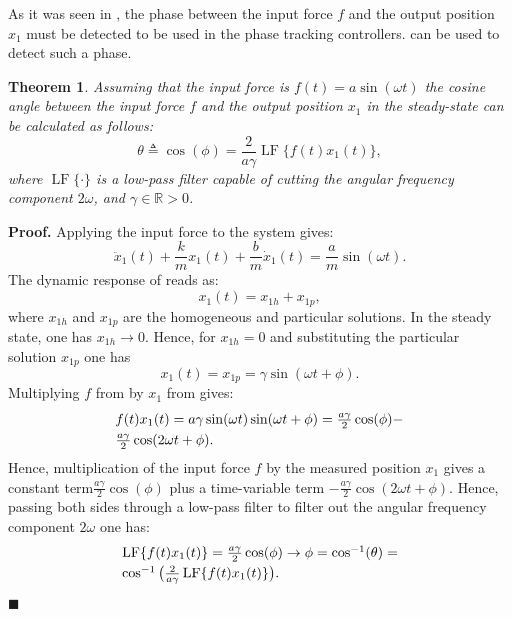 \documentclass[lettersize,journal]{IEEEtran}
\DeclareMathOperator{\LF}{LF}
\newtheorem{theorem}{Theorem}
\begin{document}
As it was seen in , the phase between the input force $f$ and the output position $x_1$ must be detected to be used in the phase tracking controllers.  can be used to detect such a phase.
\begin{theorem} \label{Lemma_phase_detection}
Assuming that the input force is $f(t)=a\sin(\omega t)$ the cosine angle between the input force $f$ and the output position $x_1$ in the steady-state can be calculated as follows:
\begin{equation}
\theta\triangleq \cos(\phi) = \frac{2} {a\gamma}\LF \{f(t)x_1(t) \} ,
\label{E_phase_calculated}
\end{equation}
where $\LF\{\cdot\}$ is a low-pass filter capable of cutting the angular frequency component $2\omega$, and $\gamma \in \mathbb{R}>0$.
\end{theorem}
\noindent \textbf{Proof.}
Applying the input force  to the system  gives:
\begin{equation}
\ddot{x}_1(t)+\frac{k}{m}x_1(t)+\frac{b}{m} \dot{x}_1(t) =\frac{a}{m}\sin(\omega t) .
\label{E_plant_closed_loop}
\end{equation}
The dynamic response of  reads as:
\begin{equation}
x_1(t)=x_{1h}+x_{1p},
\end{equation}
where $x_{1h}$ and $x_{1p}$ are the homogeneous and particular solutions. In the steady state, one has $x_{1h} \rightarrow 0$. Hence, for $x_{1h}=0$ and substituting the particular solution $x_{1p}$ one has 
\begin{equation}
x_1(t)=x_{1p}=\gamma\sin(\omega t+\phi).
\label{E_x_1_steady}
\end{equation}
Multiplying $f$ from  by $x_1$ from  gives:
\begin{equation}
\begin{array}{l}
f(t)x_1(t)=a\gamma\sin(\omega t)\sin(\omega t+\phi)=\frac{a\gamma}{2}\cos(\phi)- \vspace{0.1cm} \\ 
\frac{a\gamma}{2}\cos(2\omega t +\phi) .
\end{array}
\label{E_multiple_avant}
\end{equation}
Hence, multiplication of the input force $f$ by the measured position $x_1$ gives a constant term$\frac{a\gamma}{2}\cos(\phi)$ plus a time-variable term $-\frac{a\gamma}{2}\cos(2\omega t +\phi)$. Hence, passing both sides through a low-pass filter to filter out the angular frequency component $2\omega$ one has:
\begin{equation}
\begin{array}{l}
\LF \{f(t)x_1(t) \}=\frac{a\gamma}{2}\cos(\phi)  \rightarrow  \phi =\cos^{-1} (\theta)= \vspace{0.1cm} \\ 
\cos^{-1} \big( \frac{2} {a\gamma}\LF \{f(t)x_1(t) \} \big) .
\end{array}
\label{E_multiple_avant_filter}
\end{equation}
 $\blacksquare$
\end{document}

